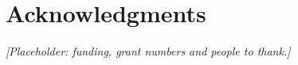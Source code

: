 \ifPaperAnonymous\else
\section*{Acknowledgments}

\textit{[Placeholder: funding, grant numbers and people to thank.]}
\fi
